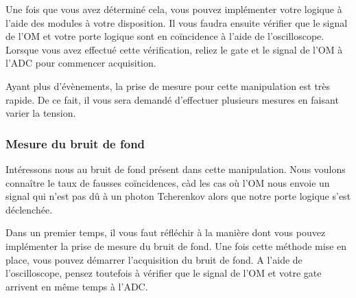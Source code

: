 Une fois que vous avez déterminé cela, vous pouvez implémenter votre logique à l'aide des modules à votre disposition. Il vous faudra ensuite vérifier que le signal de l'OM et votre porte logique sont en coïncidence à l'aide de l'oscilloscope. Lorsque vous avez effectué cette vérification, reliez le gate et le signal de l'OM à l'ADC pour commencer acquisition.

Ayant plus d'évènements, la prise de mesure pour cette manipulation est très rapide. De ce fait, il vous sera demandé d'effectuer plusieurs mesures en faisant varier la tension.


\subsubsection{Mesure du bruit de fond}
Intéressons nous au bruit de fond présent dans cette manipulation. Nous voulons connaître le taux de fausses coïncidences, càd les cas où l'OM nous envoie un signal qui n'est pas dû à un photon Tcherenkov alors que notre porte logique s'est déclenchée.

Dans un premier temps, il vous faut réfléchir à la manière dont vous pouvez implémenter la prise de mesure du bruit de fond. Une fois cette méthode mise en place, vous pouvez démarrer l'acquisition du bruit de fond. A l'aide de l'oscilloscope, pensez toutefois à vérifier que le signal de l'OM et votre gate arrivent en même temps à l'ADC.


